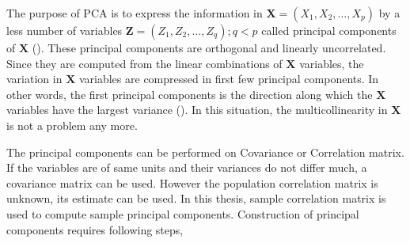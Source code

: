 \documentclass[12pt, lot, lof]{thesis}\usepackage[]{graphicx}\usepackage[]{color}
\newcommand{\bs}[1]{\ensuremath{\boldsymbol{#1}}}
\newcommand{\mbf}[1]{\ensuremath{\mathbf{#1}}}
\newcommand{\vl}[2]{\ensuremath{#1_1, #1_2, \ldots, #1_#2}}
\begin{document}
The purpose of PCA is to express the information in $\bs{X}=(\vl{X}{p})$ by a less number of variables $\mbf{Z}=(\vl{Z}{q}); q<p$ called principal components of \mbf{X} (\cite{martens1992multivariate}). These principal components are orthogonal and linearly uncorrelated. Since they are computed from the linear combinations of $\bs{X}$ variables, the variation in \mbf{X} variables are compressed in first few principal components. In other words, the first principal components is the direction along which the $\bs{X}$ variables have the largest variance (\cite{massart1998handbook}). In this situation, the multicollinearity in $\bs{X}$ is not a problem any more.

The principal components can be performed on Covariance or Correlation matrix. If the variables are of same units and their variances do not differ much, a covariance matrix can be used. However the population correlation matrix is unknown, its estimate can be used. In this thesis, sample correlation matrix is used to compute sample principal components. Construction of principal components requires following steps,
\end{document}
